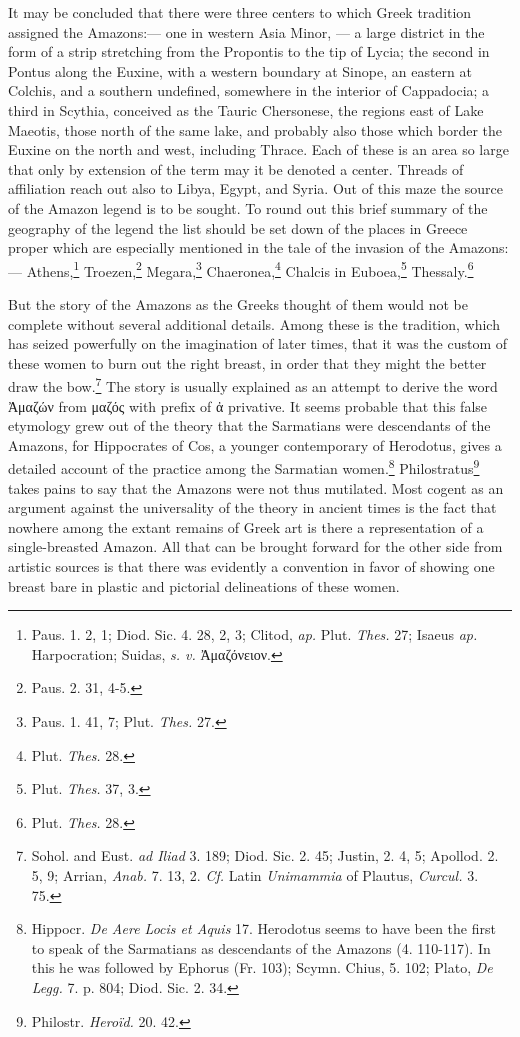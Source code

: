 \documentclass[a4paper, 12pt, oneside]{article}
\begin{document}
It may be concluded that there were three centers to which Greek tradition assigned the Amazons:--- one in western Asia Minor, --- a large district in the form of a strip stretching from the Propontis to the tip of Lycia; the second in Pontus along the Euxine, with a western boundary at Sinope, an eastern at Colchis, and a southern undefined, somewhere in the interior of Cappadocia; a third in Scythia, conceived as the Tauric Chersonese, the regions east of Lake Maeotis, those north of the same lake, and probably also those which border the Euxine on the north and west, including Thrace. Each of these is an area so large that only by extension of the term may it be denoted a center. Threads of affiliation reach out also to Libya, Egypt, and Syria. Out of this maze the source of the Amazon legend is to be sought. To round out this brief summary of the geography of the legend the list should be set down of the places in Greece proper which are especially mentioned in the tale of the invasion of the Amazons:--- Athens,\footnote{Paus. 1. 2, 1; Diod. Sic. 4. 28, 2, 3; Clitod, \emph{ap.} Plut. \emph{Thes.} 27; Isaeus \emph{ap.} Harpocration; Suidas, \emph{s. v.} Ἀμαζόνειον.} Troezen,\footnote{Paus. 2. 31, 4-5.} Megara,\footnote{Paus. 1. 41, 7; Plut. \emph{Thes.} 27.} Chaeronea,\footnote{Plut. \emph{Thes.} 28.} Chalcis in Euboea,\footnote{Plut. \emph{Thes.} 37, 3.} Thessaly.\footnote{Plut. \emph{Thes.} 28.}

But the story of the Amazons as the Greeks thought of them would not be complete without several additional details. Among these is the tradition, which has seized powerfully on the imagination of later times, that it was the custom of these women to burn out the right breast, in order that they might the better draw the bow.\footnote{Sohol. and Eust. \emph{ad Iliad} 3. 189; Diod. Sic. 2. 45; Justin, 2. 4, 5; Apollod. 2. 5, 9; Arrian, \emph{Anab.} 7. 13, 2. \emph{Cf.} Latin \emph{Unimammia} of Plautus, \emph{Curcul.} 3. 75.} The story is usually explained as an attempt to derive the word Ἀμαζών from μαζός with prefix of ἀ privative. It seems probable that this false etymology grew out of the theory that the Sarmatians were descendants of the Amazons, for Hippocrates of Cos, a younger contemporary of Herodotus, gives a detailed account of the practice among the Sarmatian women.\footnote{Hippocr. \emph{De Aere Locis et Aquis} 17. Herodotus seems to have been the first to speak of the Sarmatians as descendants of the Amazons (4. 110-117). In this he was followed by Ephorus (Fr. 103); Scymn. Chius, 5. 102; Plato, \emph{De Legg.} 7. p. 804; Diod. Sic. 2. 34.} Philostratus\footnote{Philostr. \emph{Heroïd.} 20. 42.} takes pains to say that the Amazons were not thus mutilated. Most cogent as an argument against the universality of the theory in ancient times is the fact that nowhere among the extant remains of Greek art is there a representation of a single-breasted Amazon. All that can be brought forward for the other side from artistic sources is that there was evidently a convention in favor of showing one breast bare in plastic and pictorial delineations of these women.
\end{document}
